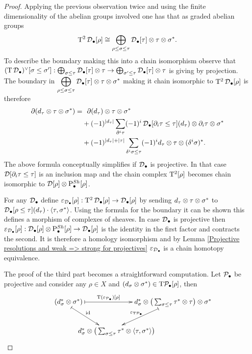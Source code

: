 \documentclass[main.tex]{subfiles}
\begin{document}
\begin{lemma}
\begin{proof}
Applying the previous observation twice and using the finite dimensionality of the abelian groups involved one has that as graded abelian groups
$$\T^2\D_\bullet[\rho]\cong\bigoplus_{\rho\leq\sigma\leq\tau}\D_\bullet[\tau]\tensor\tau\tensor\sigma^*.$$
To describe the boundary making this into a chain isomorphism observe that $(\T\D_\bullet)^\vee[\sigma\leq\sigma']:\bigoplus_{\sigma\leq\tau}\D_\bullet[\tau]\tensor\tau\to\bigoplus_{\sigma'\leq\tau}\D_\bullet[\tau]\tensor\tau$ is giving by projection. The boundary in $\displaystyle{\bigoplus_{\rho\leq\sigma\leq\tau}\D_\bullet[\tau]\tensor\tau\tensor\sigma^*}$ making it chain isomorphic to $\T^2\D_\bullet[\rho]$ is therefore
\begin{align*}
\partial(d_\tau\tensor\tau\tensor\sigma^*)=&\ \ \partial(d_\tau)\tensor\tau\tensor\sigma^*\\
&+ (-1)^{|d_\tau|}\sum_{\partial^i\tau}(-1)^i\D_\bullet[\partial_i\tau\leq\tau](d_\tau)\tensor\partial_i\tau\tensor\sigma^*\\
&+(-1)^{|d_\tau|+|\tau|}\sum_{\delta^i\sigma\leq\tau}(-1)^id_\tau\tensor\tau\tensor(\delta^i\sigma)^*.
\end{align*}
The above formula conceptually simplifies if $\D_\bullet$ is projective. In that case $\D[\partial_i\tau\leq\tau]$ is an inclusion map and the chain complex $\T^2[\rho]$ becomes chain isomorphic to $\D[\rho]\tensor\Ps[\rho]$.

For any $\D_\bullet$ define $\varepsilon_{\D_\bullet}[\rho]:\T^2\D_\bullet[\rho]\to\D_\bullet[\rho]$ by sending $d_\tau\tensor\tau\tensor\sigma^*$ to $\D_\bullet[\rho\leq\tau](d_\tau)\cdot\langle\tau,\sigma^*\rangle$. Using the formula for the boundary it can be shown this defines a morphism of complexes of sheaves. In case $\D_\bullet$ is projective then $\varepsilon_{\D_\bullet}[\rho]:\D_\bullet[\rho]\tensor\Ps[\rho]\to\D_\bullet[\rho]$ is the identity in the first factor and contracts the second. It is therefore a homology isomorphism and by Lemma \ref{Projective resolutions and weak => strong for projectives} $\varepsilon_{\D_\bullet}$ is a chain homotopy equivalence.

The proof of the third part becomes a straightforward computation. Let $\P_\bullet$ be projective and consider any $\rho\in X$ and $(d_\sigma\tensor\sigma^*)\in\T\P_\bullet[\rho]$, then
$$\xymatrix@C=-3pc{\ \ \ \ \ (d^*_\sigma\tensor\sigma^*) \ar@{|->}[rr]^-{\T(\varepsilon_{\P_\bullet})[\rho]} \ar@{|->}[rd]^-{\id} & & d_\sigma^*\tensor\big(\sum_{\sigma\leq\tau}\tau^*\tensor\tau\big)\tensor\sigma^* \ar@{|->}[dl]_-{\varepsilon_{\T\P_\bullet}} \\
&\ \ \ \ \ \ \  d_\sigma^*\tensor\big(\sum_{\sigma\leq\tau}\tau^*\tensor\langle\tau,\sigma^*\rangle\big) & } $$
\end{proof}
\end{lemma}
\end{document}
